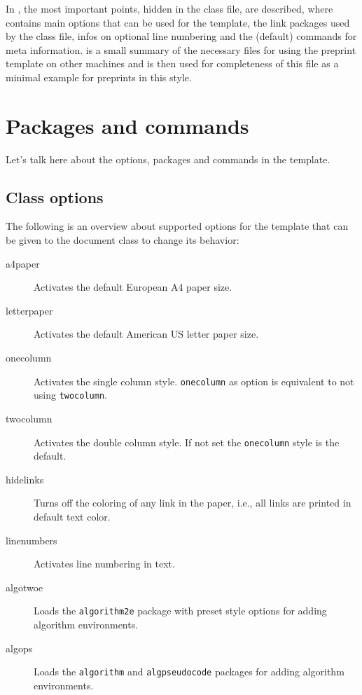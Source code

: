 \documentclass[%
  a4paper,
  twocolumn,
  algotwoe,
]{preprint}
\begin{document}
In , the most important points, hidden in the class file, are
described, where  contains main options that can be used
for the template,  the link packages used by the 
class file,  infos on optional line numbering and
 the (default) commands for meta information.
 is a small summary of the necessary files for using the
preprint template on other machines and  is then used for
completeness of this file as a minimal example for preprints in this style.



\section{Packages and commands}%
\label{sec:pkgcmd}

Let's talk here about the options, packages and commands in the template.


\subsection{Class options}%
\label{subsec:options}

The following is an overview about supported options for the template that can
be given to the document class to change its behavior:

\begin{description}
  \item[a4paper] Activates the default European A4 paper size.
  \item[letterpaper] Activates the default American US letter paper size.
  \item[onecolumn] Activates the single column style. \texttt{onecolumn}
    as option is equivalent to not using \texttt{twocolumn}.
  \item[twocolumn] Activates the double column style. If not set the 
    \texttt{onecolumn} style is the default.
  \item[hidelinks] Turns off the coloring of any link in the paper, i.e., all
    links are printed in default text color.
  \item[linenumbers] Activates line numbering in text.
  \item[algotwoe] Loads the \texttt{algorithm2e} package with preset style
    options for adding algorithm environments.
  \item[algops] Loads the \texttt{algorithm} and \texttt{algpseudocode} packages
    for adding algorithm environments.
\end{description}
\end{document}
